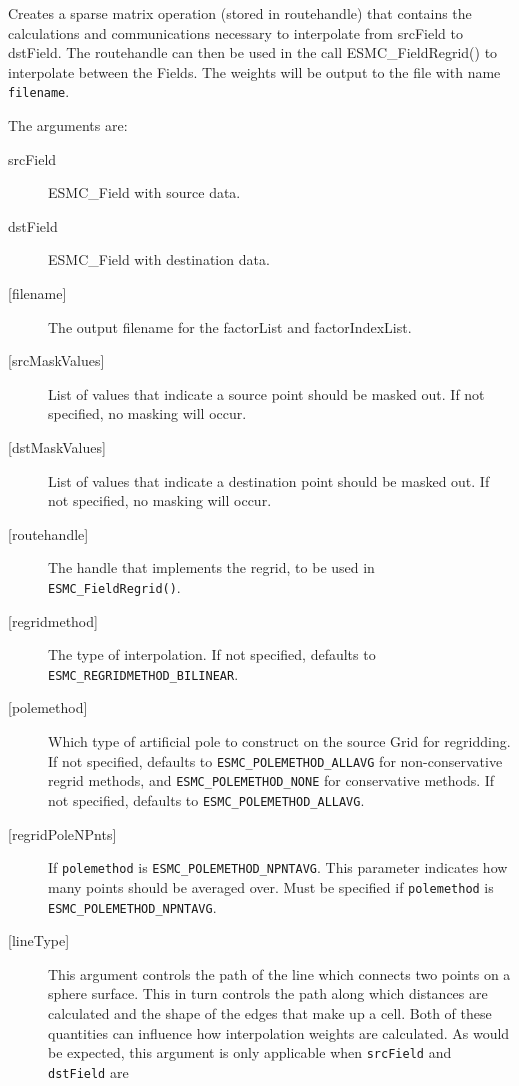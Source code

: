   
     Creates a sparse matrix operation (stored in routehandle) that contains
     the calculations and communications necessary to interpolate from srcField
     to dstField. The routehandle can then be used in the call ESMC\_FieldRegrid()
     to interpolate between the Fields. The weights will be output to the file
     with name {\tt filename}.
  
    The arguments are:
    \begin{description}
    \item[srcField]
      ESMC\_Field with source data.
    \item[dstField]
      ESMC\_Field with destination data.
    \item[{[filename]}]
      The output filename for the factorList and factorIndexList.
    \item[{[srcMaskValues]}]
      List of values that indicate a source point should be masked out.
      If not specified, no masking will occur.
    \item[{[dstMaskValues]}]
      List of values that indicate a destination point should be masked out.
      If not specified, no masking will occur.
    \item[{[routehandle]}]
      The handle that implements the regrid, to be used in {\tt ESMC\_FieldRegrid()}.
    \item[{[regridmethod]}]
      The type of interpolation. If not specified, defaults to {\tt ESMC\_REGRIDMETHOD\_BILINEAR}.
    \item [{[polemethod]}]
      Which type of artificial pole
      to construct on the source Grid for regridding.
      If not specified, defaults to {\tt ESMC\_POLEMETHOD\_ALLAVG} for non-conservative regrid methods,
      and {\tt ESMC\_POLEMETHOD\_NONE} for conservative methods.
      If not specified, defaults to {\tt ESMC\_POLEMETHOD\_ALLAVG}.
    \item [{[regridPoleNPnts]}]
      If {\tt polemethod} is {\tt ESMC\_POLEMETHOD\_NPNTAVG}.
      This parameter indicates how many points should be averaged
      over. Must be specified if {\tt polemethod} is
      {\tt ESMC\_POLEMETHOD\_NPNTAVG}.
    \item [{[lineType]}]
      This argument controls the path of the line which connects two points on a sphere surface. This in
      turn controls the path along which distances are calculated and the shape of the edges that make
      up a cell. Both of these quantities can influence how interpolation weights are calculated.
      As would be expected, this argument is only applicable when {\tt srcField} and {\tt dstField} are

\end{description}
